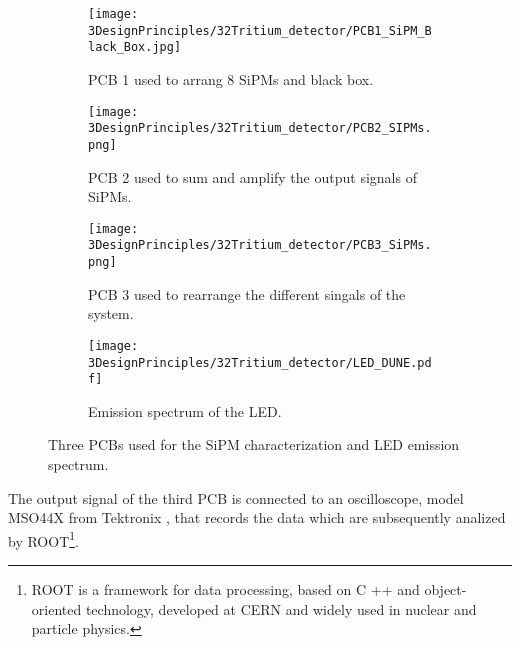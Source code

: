 \begin{figure}
\centering
    \begin{subfigure}[b]{0.5\textwidth}
    \centering
    \texttt{[image: 3DesignPrinciples/32Tritium\_detector/PCB1\_SiPM\_Black\_Box.jpg]}  
    \caption{PCB 1 used to arrang 8 SiPMs and black box.\label{subfig:PCB1}}
    \end{subfigure}
    \hfill
    \begin{subfigure}[b]{0.45\textwidth}
    \centering
    \texttt{[image: 3DesignPrinciples/32Tritium\_detector/PCB2\_SIPMs.png]}  
    \caption{PCB 2 used to sum and amplify the output signals of SiPMs.\label{subfig:PCB2}}
    \end{subfigure}
    \hfill
    \begin{subfigure}[b]{0.4\textwidth}
    \centering
    \texttt{[image: 3DesignPrinciples/32Tritium\_detector/PCB3\_SiPMs.png]}  
    \caption{PCB 3 used to rearrange the different singals of the system.\label{subfig:PCB3}}
    \end{subfigure}
    \hfill
    \begin{subfigure}[b]{0.5\textwidth}
    \centering
    \texttt{[image: 3DesignPrinciples/32Tritium\_detector/LED\_DUNE.pdf]}  
    \caption{Emission spectrum of the LED.\label{subfig:LEDSpectrum}}
    \end{subfigure}
 \caption{Three PCBs used for the SiPM characterization and LED emission spectrum.}
 \label{fig:PCBs_LEDSpectrum}
\end{figure}

The output signal of the third PCB is connected to an oscilloscope, model MSO44X from Tektronix \cite{Oscilloscope}, that records the data which are subsequently analized by ROOT\footnote{ROOT is a framework for data processing, based on C ++ and object-oriented technology, developed at CERN and widely used in nuclear and particle physics.}.
